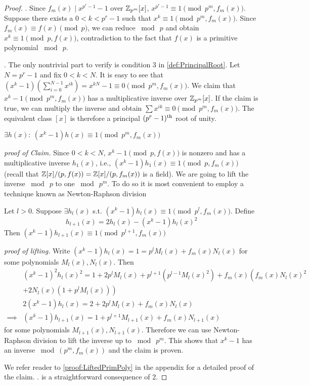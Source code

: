 \begin{proof}
    . \quad Since \(f_m(x) \mid x^{p^r -  1} - 1\) over \(\mathbb{Z}_{p^m}[x]\), \(x^{p^r - 1} \equiv 1 \pmod{p^m, f_m(x)}\). Suppose there exists a \(0 < k < p^r - 1\) such that \(x^k \equiv 1 \pmod{p^m, f_m(x)}\). Since \(f_m(x) \equiv f(x) \pmod{p}\), we can reduce \(\bmod \  p\) and obtain \(x^k \equiv 1 \pmod{p, f(x)}\), contradiction to the fact that \(f(x)\) is a primitive polynomial \(\bmod \  p\).

    \smallskip
    . \quad The only nontrivial part to verify is condition 3 in \cref{def:PrincipalRoot}. Let \(N = p^r - 1\) and fix \(0 < k < N\). It is easy to see that \((x^k - 1)(\sum_{i=0}^{N-1} x^{ik}) = x^{kN} - 1 \equiv 0 \pmod{p^m, f_m(x)}\). We claim that \(x^k - 1 \pmod{p^m, f_m(x)}\) has a multiplicative inverse over \(\mathbb{Z}_{p^m}[x]\). If the claim is true, we can multiply the inverse and obtain \(\sum x^{ik} \equiv 0 \pmod{p^m, f_m(x)}\). The equivalent class \([x]\) is therefore a principal \((p^r - 1)\textsuperscript{th}\) root of unity.

    \ifFullVersion
    \medskip
     \(\exists h(x):\: (x^k - 1)h(x) \equiv 1 \pmod{p^m, f_m(x)}\)

    \noindent\emph{proof of Claim.} \quad Since \(0 < k < N\), \(x^k - 1 \pmod{p, f(x)}\) is nonzero and has a multiplicative inverse \(h_1(x)\), i.e., \((x^k - 1)h_1(x) \equiv 1 \pmod{p, f_m(x)}\) (recall that \(\mathbb{Z}[x]/(p, f(x)) = \mathbb{Z}[x]/(p, f_m(x))\) is a field). We are going to lift the inverse \(\bmod \  p\) to one \(\bmod \  p^m\). To do so it is most convenient to employ a technique known as Newton-Raphson division~\cite{MISC:WikiNewton}

    \smallskip
    Let \(l > 0\). Suppose \(\exists h_l(x)\) s.t. \((x^k - 1)h_l(x) \equiv 1 \pmod{p^l, f_m(x)}\). Define
    \[h_{l+1}(x) = 2 h_l(x) - (x^k - 1)h_l(x)^2\]
    Then \((x^k - 1)h_{l+1}(x) \equiv 1 \pmod{p^{l+1}, f_m(x)}\)

    \noindent\emph{proof of lifting.} \quad Write \((x^k - 1)h_l(x) = 1 = p^l M_l(x) + f_m(x) N_l(x)\) for some polynomials \(M_l(x), N_l(x)\). Then
    \begin{align*}
        &(x^k - 1)^2h_l(x)^2 = 1 + 2p^l M_l(x) + p^{l+1}(p^{l-1}M_l(x)^2) + f_m(x)\left(f_m(x) N_l(x)^2  \right.\\
        &\left. + 2 N_l(x) (1 + p^l M_l(x)) \right) \\
        &2(x^k - 1)h_l(x) = 2 + 2p^l M_l(x) + f_m(x) N_l(x) \\
        \implies &(x^k - 1)h_{l+1}(x) = 1 + p^{l+1} M_{l+1}(x) + f_m(x) N_{l+1}(x)
    \end{align*}
    for some polynomials \(M_{l+1}(x), N_{l+1}(x)\). Therefore we can use Newton-Raphson division to lift the inverse up to \(\bmod \  p^m\). This shows that \(x^k - 1\) has an inverse \(\bmod (p^m, f_m(x))\) and the claim is proven.

    \medskip
    \else
    We refer reader to \cref{proof:LiftedPrimPoly} in the appendix for a detailed proof of the claim.
    \fi
    . \quad is a straightforward consequence of 2.
\end{proof}

